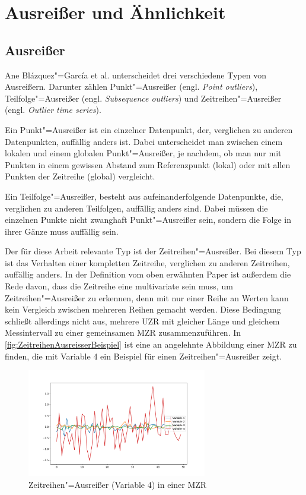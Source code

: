 \section{Ausreißer und Ähnlichkeit}
\subsection{Ausreißer}
Ane Blázquez"=García et al. \cite[Ch. 2.2]{reviewOutlierDetection} unterscheidet drei verschiedene Typen von Ausreißern. Darunter zählen Punkt"=Ausreißer (engl. \textit{Point outliers}), Teilfolge"=Ausreißer (engl. \textit{Subsequence outliers}) und Zeitreihen"=Ausreißer (engl. \textit{Outlier time series}).

Ein Punkt"=Ausreißer ist ein einzelner Datenpunkt, der, verglichen zu anderen Datenpunkten, auffällig anders ist. Dabei unterscheidet man zwischen einem lokalen und einem globalen Punkt"=Ausreißer, je nachdem, ob man nur mit Punkten in einem gewissen Abstand zum Referenzpunkt (lokal) oder mit allen Punkten der Zeitreihe (global) vergleicht.

Ein Teilfolge"=Ausreißer, besteht aus aufeinanderfolgende Datenpunkte, die, verglichen zu anderen Teilfolgen, auffällig anders sind. Dabei müssen die einzelnen Punkte nicht zwanghaft Punkt"=Ausreißer sein, sondern die Folge in ihrer Gänze muss auffällig sein. 

Der für diese Arbeit relevante Typ ist der Zeitreihen"=Ausreißer. Bei diesem Typ ist das Verhalten einer kompletten Zeitreihe, verglichen zu anderen Zeitreihen, auffällig anders. In der Definition vom oben erwähnten Paper \cite{reviewOutlierDetection} ist außerdem die Rede davon, dass die Zeitreihe eine multivariate sein muss, um Zeitreihen"=Ausreißer zu erkennen, denn mit nur einer Reihe an Werten kann kein Vergleich zwischen mehreren Reihen gemacht werden. Diese Bedingung schließt allerdings nicht aus, mehrere \acs{UZR} mit gleicher Länge und gleichem Messintervall zu einer gemeinsamen \acs{MZR} zusammenzuführen. In \autoref{fig:ZeitreihenAusreisserBeispiel} ist eine an \cite[Fig. 5]{reviewOutlierDetection} angelehnte Abbildung einer \acs{MZR} zu finden, die mit Variable 4 ein Beispiel für einen Zeitreihen"=Ausreißer zeigt.
\begin{figure}[bth] 
  \centering
  \includegraphics[width=0.7\textwidth]{Graphics/TimeSeriesOutlierExample.pdf}
  \caption{Zeitreihen"=Ausreißer (Variable 4) in einer \acs{MZR}}
  \label{fig:ZeitreihenAusreisserBeispiel}
\end{figure}

